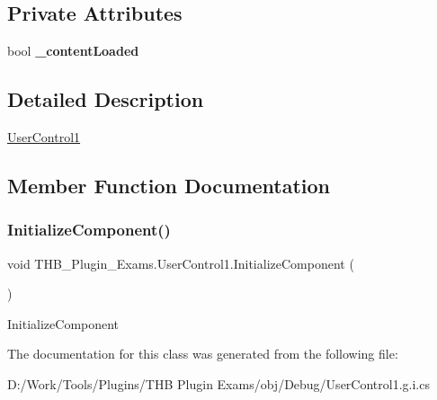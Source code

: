 \subsection*{Private Attributes}
\begin{DoxyCompactItemize}
\item 
\mbox{\label{class_t_h_b___plugin___exams_1_1_user_control1_a0af4bcadce35594e7decef2aca6ae954}} 
bool {\bfseries \+\_\+content\+Loaded}
\end{DoxyCompactItemize}


\subsection{Detailed Description}
\mbox{\hyperlink{class_t_h_b___plugin___exams_1_1_user_control1}{User\+Control1}} 



\subsection{Member Function Documentation}
\mbox{\label{class_t_h_b___plugin___exams_1_1_user_control1_a00b30a8b0179c27805d9f9565070adba}} 
\subsubsection{\texorpdfstring{Initialize\+Component()}{InitializeComponent()}}
{\footnotesize\ttfamily void T\+H\+B\+\_\+\+Plugin\+\_\+\+Exams.\+User\+Control1.\+Initialize\+Component (\begin{DoxyParamCaption}{ }\end{DoxyParamCaption})}



Initialize\+Component 



The documentation for this class was generated from the following file\+:\begin{DoxyCompactItemize}
\item 
D\+:/\+Work/\+Tools/\+Plugins/\+T\+H\+B Plugin Exams/obj/\+Debug/User\+Control1.\+g.\+i.\+cs\end{DoxyCompactItemize}
